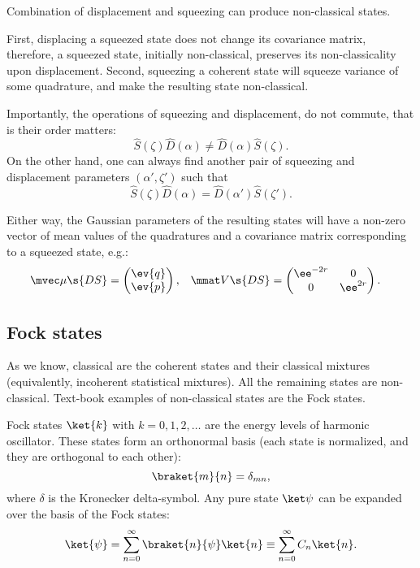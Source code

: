\documentclass[fontsize=9pt,bookmarkpackage=false]{scrartcl}
\begin{document}
Combination of displacement and squeezing can produce non-classical states.

First, displacing a squeezed state does not change its covariance matrix, therefore, a squeezed state, initially non-classical, preserves its non-classicality upon displacement.
Second, squeezing a coherent state will squeeze variance of some quadrature, and make the resulting state non-classical.

Importantly, the operations of squeezing and displacement, do not commute, that is their order matters:
\begin{equation}
  \hat S ( \zeta ) \hat D ( \alpha )  \neq \hat D (\alpha ) \hat S ( \zeta ).
\end{equation}
On the other hand, one can always find another pair of squeezing and displacement parameters $(\alpha', \zeta')$ such that
\begin{equation}
  \hat S ( \zeta ) \hat D ( \alpha ) = \hat D (\alpha' ) \hat S ( \zeta' ).
\end{equation}

Either way, the Gaussian parameters of the resulting states will have a non-zero vector of mean values of the quadratures and a covariance matrix corresponding to a squeezed state, e.g.:
\begin{align}
  \mvec \mu\s{DS} & =
  \begin{pmatrix}
    \ev{q} \\ \ev{ p}
  \end{pmatrix},
  &
  \mmat V\s{DS} & =
  \begin{pmatrix}
    \ee^{ - 2 r } & 0
    \\
    0 & \ee^{ 2 r }
  \end{pmatrix}.
\end{align}

\subsection{Fock states} %
\label{sec:fock_states}

As we know, classical are the coherent states and their classical mixtures (equivalently, incoherent statistical mixtures).
All the remaining states are non-classical.
Text-book examples of non-classical states are the Fock states.

Fock states $\ket{k}$ with $k = 0,1,2,\dots$ are the energy levels of harmonic oscillator.
These states form an orthonormal basis (each state is normalized, and they are orthogonal to each other):
\begin{equation}
  \braket{ m }{ n } = \delta_{mn },
\end{equation}
where $\delta$ is the Kronecker delta-symbol.
Any pure state $\ket \psi$ can be expanded over the basis of the Fock states:
\begin{equation}
  \ket{ \psi } = \sum_{n = 0}^\infty \braket{ n }{ \psi } \ket{n }
  \equiv \sum_{n = 0}^\infty C_n \ket{ n }.
\end{equation}
\end{document}
